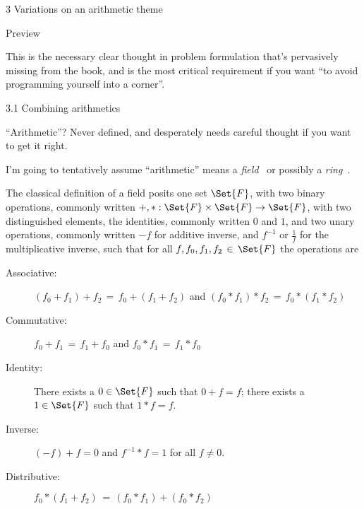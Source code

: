 \documentclass[12pt]{PalisadesLakesBook}
\begin{document}
\begin{plSection}{3 Variations on an arithmetic theme}
\begin{plSection}{Preview}
\begin{itemize}
\end{itemize}

This is the necessary clear thought  in problem formulation
that's pervasively missing from the book,
and is the most critical requirement if you want
``to avoid programming yourself into a corner''.

\end{plSection}%
\begin{plSection}{3.1 Combining arithmetics}

``Arithmetic''? Never defined, and desperately needs 
careful thought if you want to get it right.

I'm going to tentatively assume ``arithmetic'' means
a \emph{field}~\cite{wiki:FieldMathematics}
or possibly a \emph{ring}~\cite{wiki:RingMathematics}.

The classical definition of a field posits
one set $\Set{F}$,
with two binary operations, commonly written
$+, * : \Set{F} \times \Set{F} \rightarrow \Set{F}$, 
with two distinguished elements, the identities,
commonly written $0$ and $1$,
and two unary operations, commonly written 
$-f$ for additive inverse, and $f^{-1}$ or $\frac{1}{f}$
for the multiplicative inverse,
such that for all 
$f, f_{0}, f_{1}, f_{2} \, \in \, \Set{F}$
the operations are
\begin{description}

\item[Associative:] 
$\left( f_{0} + f_{1} \right) + f_{2} 
\,=\, 
f_{0} + \left( f_{1} + f_{2} \right)$
and 
$\left( f_{0} * f_{1} \right) * f_{2} 
\,=\, 
f_{0} * \left( f_{1} * f_{2} \right)$

\item[Commutative:] 
$f_{0} + f_{1} \,=\, f_{1} + f_{0}$
and 
$f_{0} * f_{1} \,=\, f_{1} * f_{0}$

\item[Identity:] There exists a $0 \in \Set{F}$ such that
$0 + f = f$;
there exists a $1 \in \Set{F}$ such that $1 * f = f$.

\item[Inverse:] $\left(-f\right) + f = 0$
and $f^{-1}*f = 1$ for all $f\neq0$.

\item[Distributive:] 
$f_{0} * \left( f_{1} + f_{2} \right)
\,=\, 
\left(f_{0} * f_{1} \right) + \left(f_{0} * f_{2} \right)$

\end{description}


\end{plSection}
\end{plSection}
\end{document}
